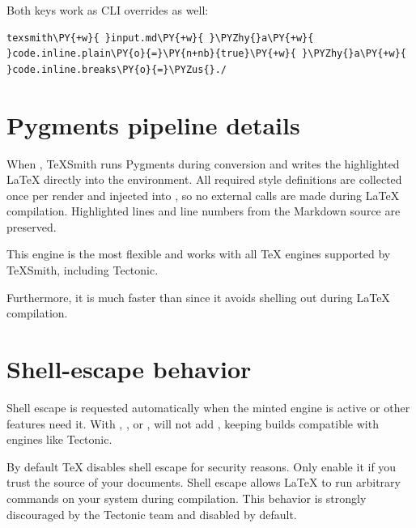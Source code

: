 \documentclass[a4paper,twoside]{article}
\begin{document}
Both keys work as CLI overrides as well:
\begin{tscode}[lang=bash, engine=pygments]
\begin{Verbatim}[commandchars=\\\{\},breaklines, breakanywhere, commandchars=\\\{\}]
texsmith\PY{+w}{ }input.md\PY{+w}{ }\PYZhy{}a\PY{+w}{ }code.inline.plain\PY{o}{=}\PY{n+nb}{true}\PY{+w}{ }\PYZhy{}a\PY{+w}{ }code.inline.breaks\PY{o}{=}\PYZus{}./
\end{Verbatim}
\end{tscode}
\section{Pygments pipeline details}
When , TeXSmith runs Pygments during conversion and writes the highlighted \LaTeX{} directly into the  environment. All required style definitions are collected once per render and injected into , so no external calls are made during \LaTeX{} compilation. Highlighted lines and line numbers from the Markdown source are preserved.

This engine is the most flexible and works with all \TeX{} engines supported by TeXSmith, including Tectonic.

Furthermore, it is much faster than  since it avoids shelling out during \LaTeX{} compilation.
\section{Shell-escape behavior}
Shell escape is requested automatically when the minted engine is active or other features need it. With , , or ,  will not add , keeping builds compatible with engines like Tectonic.
\begin{tscallout}[kind=note]
By default \TeX{} disables shell escape for security reasons. Only enable it if you trust the source of your documents. Shell escape allows \LaTeX{} to run arbitrary commands on your system during compilation. This behavior is strongly discouraged by the Tectonic team and disabled by default.
\end{tscallout}
\end{document}
